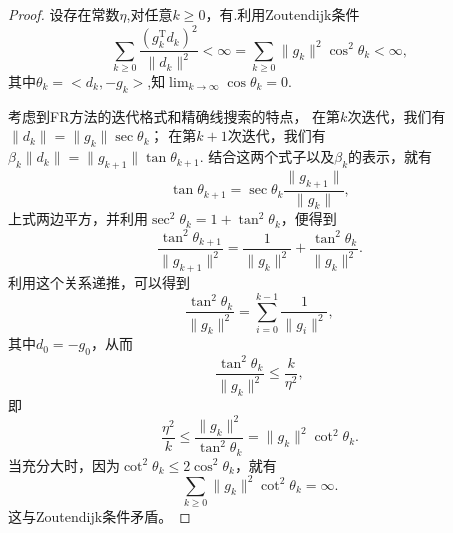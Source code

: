         \begin{proof}
            设存在常数$\eta$,对任意$k\geq0$，有.利用Zoutendijk条件
            \begin{equation}
                \displaystyle\sum_{k\geq0}\frac{(g_k^\mathrm {T}d_k)^2}{\|d_k\|^2}<\infty=
                \displaystyle\sum_{k\geq0}\|g_k\|^2\cos^2\theta_k < \infty,
                \nonumber
        	\end{equation}
            其中$\theta_k = <d_k, -g_k>$,知$\displaystyle\lim_{k\to\infty}\cos\theta_k=0$.
            
            考虑到FR方法的迭代格式和精确线搜索的特点，
            在第$k$次迭代，我们有$\|d_k\|=\|g_k\|\sec\theta_k $；
            在第$k+1$次迭代，我们有$\beta_k\|d_k\| = \|g_{k+1}\|\tan\theta_{k+1}$.
            结合这两个式子以及$\beta_k$的表示，就有
            \begin{equation}
                \tan\theta_{k+1}=\sec\theta_k\displaystyle\frac{\|g_{k+1}\|}{\|g_k\|},
                \nonumber
        	\end{equation}
        	上式两边平方，并利用$\sec^2\theta_k=1+\tan^2\theta_k$，便得到
            \begin{equation}
                \displaystyle\frac{\tan^2\theta_{k+1}}{\|g_{k+1}\|^2} = 
                \displaystyle\frac{1}{\|g_k\|^2} + 
                \displaystyle\frac{\tan^2\theta_k}{\|g_k\|^2}.
                \nonumber
        	\end{equation}
        	利用这个关系递推，可以得到
            \begin{equation}
                \displaystyle\frac{\tan^2\theta_k}{\|g_k\|^2} = 
                \displaystyle\sum_{i=0}^{k-1}\frac{1}{\|g_i\|^2},
                \nonumber
        	\end{equation}
        	其中$d_0=-g_0$，从而
            \begin{equation}
                \displaystyle\frac{\tan^2\theta_k}{\|g_k\|^2} \leq
                \displaystyle\frac{k}{\eta^2},
                \nonumber
        	\end{equation}
        	即
            \begin{equation}
                \displaystyle\frac{\eta^2}{k} \leq
                \displaystyle\frac{\|g_k\|^2}{\tan^2\theta_k} =
                \|g_k\|^2\cot^2\theta_k.
                \nonumber
        	\end{equation}
        	当充分大时，因为$\cot^2\theta_k\leq2\cos^2\theta_k$，就有
            \begin{equation}
                \displaystyle\sum_{k\geq0}\|g_k\|^2\cot^2\theta_k = \infty.
                \nonumber
        	\end{equation}
        	这与Zoutendijk条件矛盾。
        \end{proof}